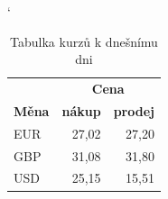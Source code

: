 \documentclass[a4paper, 11pt]{article}
\begin{document}
\begin{table}[h]
\bigskip
\catcode`
\centering
\begin{tabular}{|l|r|r|}
\hline
                      & \multicolumn{2}{c|}{\textbf{Cena}} \\ \cline{2-3} 
\textbf{Měna}               & \textbf{nákup }      & \textbf{prodej}      \\ \hline
EUR                   & 27,02       & 27,20       \\ 
GBP                   & 31,08       & 31,80       \\ 
USD                   & 25,15       & 15,51       \\ \hline
\end{tabular}
\caption{Tabulka kurzů k dnešnímu dni} \label{tab.1}
\end{table}
\end{document}
